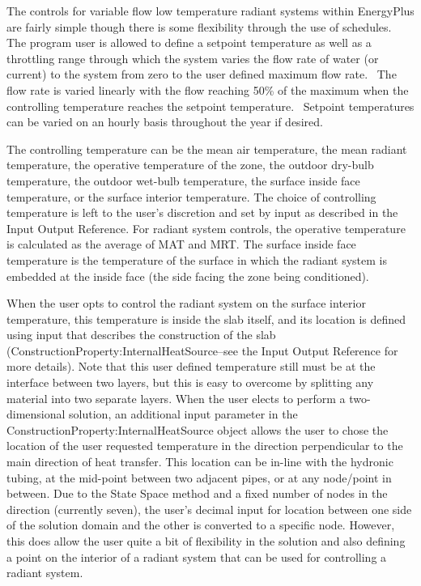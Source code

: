 The controls for variable flow low temperature radiant systems within EnergyPlus are fairly simple though there is some flexibility through the use of schedules.~ The program user is allowed to define a setpoint temperature as well as a throttling range through which the system varies the flow rate of water (or current) to the system from zero to the user defined maximum flow rate.~ The flow rate is varied linearly with the flow reaching 50\% of the maximum when the controlling temperature reaches the setpoint temperature.~ Setpoint temperatures can be varied on an hourly basis throughout the year if desired.

The controlling temperature can be the mean air temperature, the mean radiant temperature, the operative temperature of the zone, the outdoor dry-bulb temperature, the outdoor wet-bulb temperature, the surface inside face temperature, or the surface interior temperature.  The choice of controlling temperature is left to the user's discretion and set by input as described in the Input Output Reference.  For radiant system controls, the operative temperature is calculated as the average of MAT and MRT.  The surface inside face temperature is the temperature of the surface in which the radiant system is embedded at the inside face (the side facing the zone being conditioned).

When the user opts to control the radiant system on the surface interior
temperature, this temperature is inside the slab itself, and its location is
defined using input that describes the construction of the slab
(ConstructionProperty:InternalHeatSource--see the Input Output Reference for
more details).  Note that this user defined temperature still must be at the
interface between two layers, but this is easy to overcome by splitting any
material into two separate layers.  When the user elects to perform a
two-dimensional solution, an additional input parameter in the
ConstructionProperty:InternalHeatSource object allows the user to chose the
location of the user requested temperature in the direction perpendicular to
the main direction of heat transfer.  This location can be in-line with the
hydronic tubing, at the mid-point between two adjacent pipes, or at any
node/point in between.  Due to the State Space method and a fixed number of
nodes in the direction (currently seven), the user's decimal input for location
between one side of the solution domain and the other is converted to a
specific node.  However, this does allow the user quite a bit of flexibility in
the solution and also defining a point on the interior of a radiant system that
can be used for controlling a radiant system.

